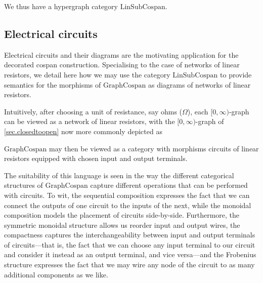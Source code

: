 We thus have a hypergraph category $\mathrm{LinSubCospan}$.

\subsection{Electrical circuits} 
Electrical circuits and their diagrams are the motivating application for the
decorated cospan construction. Specialising to the case of networks of linear
resistors, we detail here how we may use the category $\mathrm{LinSubCospan}$ to
provide semantics for the morphisms of $\mathrm{GraphCospan}$ as diagrams of
networks of linear resistors.

Intuitively, after choosing a unit of resistance, say ohms ($\Omega$), each
$[0,\infty)$-graph can be viewed as a network of linear resistors, with the
$[0,\infty)$-graph of \textsection\ref{sec.closedtoopen} now more commonly
depicted as
\begin{center}
\end{center}
$\mathrm{GraphCospan}$ may then be viewed as a category with morphisms
circuits of linear resistors equipped with chosen input and output terminals.

The suitability of this language is seen in the way the different categorical
structures of $\mathrm{GraphCospan}$ capture different operations that can be
performed with circuits. To wit, the sequential composition expresses the fact
that we can connect the outputs of one circuit to the inputs of the next, while
the monoidal composition models the placement of circuits side-by-side.
Furthermore, the symmetric monoidal structure allows us reorder input and output
wires, the compactness captures the interchangeability between input and
output terminals of circuits---that is, the fact that we can choose any input
terminal to our circuit and consider it instead as an output terminal, and vice
versa---and the Frobenius structure expresses the fact that we may wire any
node of the circuit to as many additional components as we like.


